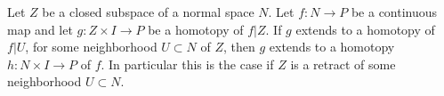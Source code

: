 Let $Z$ be a closed subspace of a normal space $N$. Let $f: N \to P$ be a continuous map and let $g: Z \times I \to P$ be a homotopy of $f|Z$. If $g$ extends to a homotopy of $f|U$, for some neighborhood $U \subset N$ of $Z$, then $g$ extends to a homotopy $h: N \times I \to P$ of $f$. In particular this is the case if $Z$ is a retract of some neighborhood $U \subset N$.
